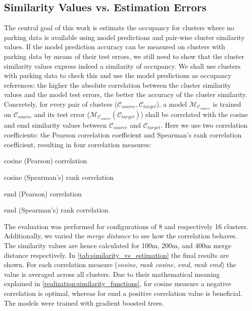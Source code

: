 \subsection{Similarity Values vs. Estimation Errors}
\label{evaluation:similarity_vs_estimation_sec}
The central goal of this work is estimate the occupancy for clusters where no parking data is available using model predictions and pair-wise cluster similarity values. If the model prediction accuracy can be measured on clusters with parking data by means of their test errors, we still need to show that the cluster similarity values express indeed a similarity of occupancy. We shall use clusters with parking data to check this and use the model predictions as occupancy references: the higher the absolute correlation between the cluster similarity values and the model test errors, the better the accuracy of the cluster similarity. Concretely, for every pair of clusters ($\mathcal{C}_{source}, \mathcal{C}_{target}$), a model $\mathcal{M}_{\mathcal{C}_{source}}$ is trained on $\mathcal{C}_{source}$ and its test error ($\mathcal{M}_{\mathcal{C}_{source}}(\mathcal{C}_{target})$) shall be correlated with the cosine and emd similarity values between $\mathcal{C}_{source}$ and $\mathcal{C}_{target}$. Here we use two correlation coefficients: the Pearson correlation coefficient and Spearman's rank correlation coefficient, resulting in four correlation measures: 
\begin{romanlist}
	\item	cosine (Pearson) correlation
	\item 	cosine (Spearman's) rank correlation
	\item 	emd (Pearson) correlation
	\item 	emd (Spearman's) rank correlation. 
\end{romanlist}
The evaluation was performed for configurations of 8 and respectively 16 clusters. Additionally, we varied the \textit{merge distance} to see how the correlation behaves. The similarity values are hence calculated for 100m, 200m, and 400m merge distance respectively. In \cref{tab:similarity_vs_estimation} the final results are shown. For each correlation measure (\textit{cosine}, \textit{rank cosine}, \textit{emd}, \textit{rank emd}) the value is averaged across all clusters. Due to their mathematical meaning explained in \cref{realization:similarity_functions}, for cosine measure a negative correlation is optimal, whereas for emd a positive correlation value is beneficial. The models were trained with gradient boosted trees. 
	
